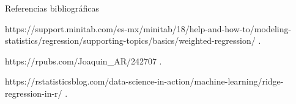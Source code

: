 \documentclass[11pt]{beamer}
\begin{document}
\begin{frame}{Referencias bibliográficas}
	\begin{thebibliography}{10}

		\beamertemplateonlinebibitems %
		https://support.minitab.com/es-mx/minitab/18/help-and-how-to/modeling-statistics/regression/supporting-topics/basics/weighted-regression/
		.

		\beamertemplateonlinebibitems %
		https://rpubs.com/Joaquin\_AR/242707
		.

		\beamertemplateonlinebibitems %
		https://rstatisticsblog.com/data-science-in-action/machine-learning/ridge-regression-in-r/
		.


	\end{thebibliography}
\end{frame}
\end{document}
